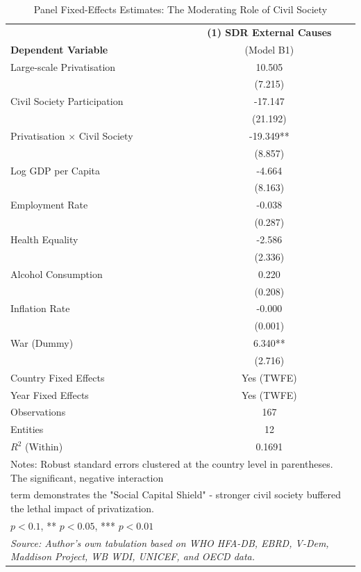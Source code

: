 \documentclass[en,magisterska]{pracamgr}
\begin{document}
\begin{table}[H]
\centering
\caption{Panel Fixed-Effects Estimates: The Moderating Role of Civil Society}
\label{tab:model_b1}
\footnotesize
\begin{tabular}{l c}
\toprule
 & \textbf{(1) SDR External Causes} \\
\textbf{Dependent Variable} & (Model B1) \\
\midrule
Large-scale Privatisation & 10.505 \\
 & (7.215) \\
Civil Society Participation & -17.147 \\
 & (21.192) \\
Privatisation $\times$ Civil Society & -19.349** \\
 & (8.857) \\
Log GDP per Capita & -4.664 \\
 & (8.163) \\
Employment Rate & -0.038 \\
 & (0.287) \\
Health Equality & -2.586 \\
 & (2.336) \\
Alcohol Consumption & 0.220 \\
 & (0.208) \\
Inflation Rate & -0.000 \\
 & (0.001) \\
War (Dummy) & 6.340** \\
 & (2.716) \\
\midrule
Country Fixed Effects & Yes (TWFE) \\
Year Fixed Effects & Yes (TWFE) \\
Observations & 167 \\
Entities & 12 \\
$R^2$ (Within) & 0.1691 \\
\bottomrule
\multicolumn{2}{l}{\scriptsize Notes: Robust standard errors clustered at the country level in parentheses. The significant, negative interaction} \\
\multicolumn{2}{l}{\scriptsize term demonstrates the "Social Capital Shield" - stronger civil society buffered the lethal impact of privatization.} \\
\multicolumn{2}{l}{\scriptsize * $p<0.1$, ** $p<0.05$, *** $p<0.01$} \\
\multicolumn{2}{l}{\scriptsize \textit{Source: Author's own tabulation based on WHO HFA-DB, EBRD, V-Dem, Maddison Project, WB WDI, UNICEF, and OECD data.}} \\
\end{tabular}
\end{table}
\end{document}
